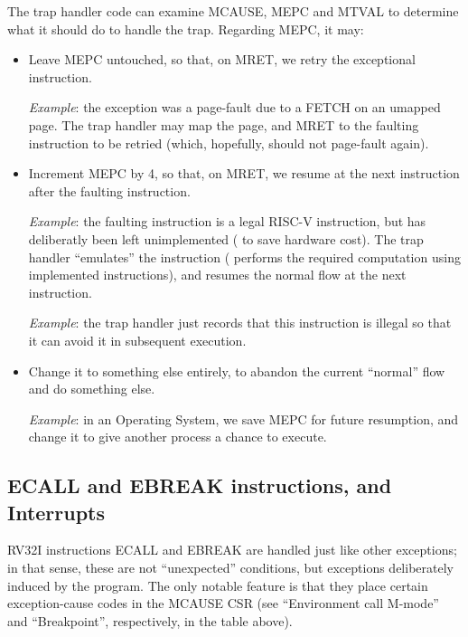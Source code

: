 The trap handler code can examine MCAUSE, MEPC and MTVAL to determine
what it should do to handle the trap.  Regarding MEPC, it may:
\begin{itemize}

 \item Leave MEPC untouched, so that, on MRET, we retry the
       exceptional instruction.

       \emph{Example}: the exception was a page-fault due to a FETCH
       on an umapped page.  The trap handler may map the page, and
       MRET to the faulting instruction to be retried (which,
       hopefully, should not page-fault again).

 \item Increment MEPC by 4, so that, on MRET, we resume at the next
       instruction after the faulting instruction.

       \emph{Example}: the faulting instruction is a legal RISC-V
       instruction, but has deliberatly been left unimplemented ({\eg}
       to save hardware cost).  The trap handler ``emulates'' the
       instruction ({\ie} performs the required computation using
       implemented instructions), and resumes the normal flow at the
       next instruction.

       \emph{Example}: the trap handler just records that this
       instruction is illegal so that it can avoid it in subsequent
       execution.

 \item Change it to something else entirely, to abandon the current
        ``normal'' flow and do something else.

       \emph{Example}: in an Operating System, we save MEPC for future
       resumption, and change it to give another process a chance to
       execute.
\end{itemize}


\subsection{ECALL and EBREAK instructions, and Interrupts}

\label{Sec_ECALL_EBREAK}

RV32I instructions ECALL and EBREAK are handled just like other
exceptions; in that sense, these are not ``unexpected'' conditions,
but exceptions deliberately induced by the program.  The only notable
feature is that they place certain exception-cause codes in the MCAUSE
CSR (see ``Environment call M-mode'' and ``Breakpoint'', respectively,
in the table above).

